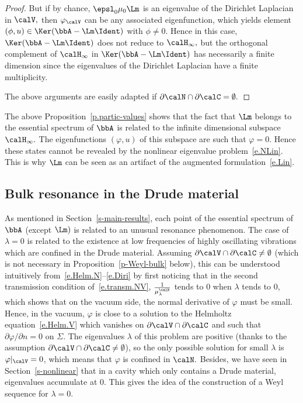 \begin{proof}
But if by chance, $\epsl_0 \mu_0 \Lm$ is an eigenvalue of the Dirichlet Laplacian in $\calV,$ then $\varphi_\calV$ can be any associated eigenfunction, which yields element $(\phi,u) \in \Ker(\bbA - \Lm\Ident)$ with $\phi \neq 0.$ Hence in this case, $\Ker(\bbA - \Lm\Ident)$ does not reduce to $\calH_\infty,$ but the orthogonal complement of $\calH_\infty$ in $\Ker(\bbA - \Lm\Ident)$ has necessarily a finite dimension since the eigenvalues of the Dirichlet Laplacian have a finite multiplicity.

The above arguments are easily adapted if $\partial\calN \cap \partial\calC = \emptyset.$
\end{proof}

\begin{rema}\label{r-artifact}
The above Proposition~\ref{p.partic-values} shows that the fact that $\Lm$ belongs to the essential spectrum of $\bbA$ is related to the infinite dimensional subspace $\calH_\infty.$ The eigenfunctions $(\varphi,u)$ of this subspace are such that $\varphi = 0.$ Hence these states cannot be revealed by the nonlinear eigenvalue problem~\eqref{e.NLin}. This is why $\Lm$ can be seen as an artifact of the augmented formulation~\eqref{e.Lin}.
\end{rema}


\subsection{Bulk resonance in the Drude material}\label{s-bulk-reson}

As mentioned in Section~\ref{s-main-results}, each point of the essential spectrum of $\bbA$ (except $\Lm)$ is related to an unusual resonance phenomenon. The case of $\lambda = 0$ is related to the existence at low frequencies of highly oscillating vibrations which are confined in the Drude material. Assuming $\partial\calV \cap \partial\calC \neq \emptyset$ (which is not necessary in Proposition~\ref{p-Weyl-bulk} below), this can be understood intuitively from~\eqref{e.Helm.N}--\eqref{e.Diri} by first noticing that in the second transmission condition of~\eqref{e.transm.NV}, $\frac{1}{\mu_\lambda^\calN}$ tends to $0$ when $\lambda$ tends to $0$, which shows that on the vacuum side, the normal derivative of $\varphi$ must be small. Hence, in the vacuum, $\varphi$ is close to a solution to the Helmholtz equation~\eqref{e.Helm.V} which vanishes on $\partial\calV \cap \partial\calC$ and such that $\partial\varphi/\partial n = 0$ on $\Sigma.$ The eigenvalues $\lambda$ of this problem are positive (thanks to the assumption $\partial\calV \cap \partial\calC \neq \emptyset$), so the only possible solution for small $\lambda$ is $\varphi|_\calV = 0$, which means that $\varphi$ is confined in $\calN.$ Besides, we have seen in Section~\ref{s-nonlinear} that in a cavity which only contains a Drude material, eigenvalues accumulate at 0. This gives the idea of the construction of a Weyl sequence for $\lambda = 0.$

